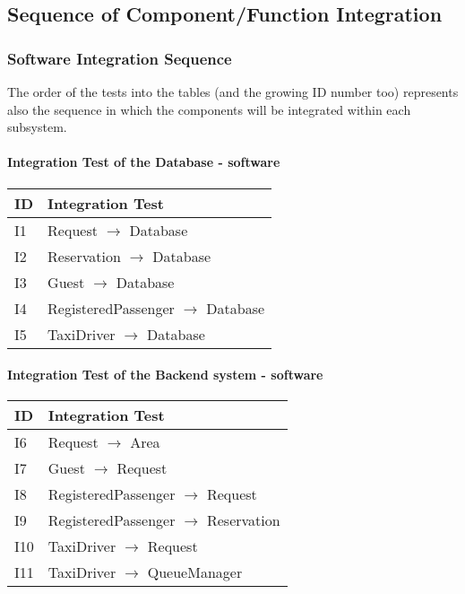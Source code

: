 	\subsection{Sequence of Component/Function Integration}
		\subsubsection{Software Integration Sequence}
		The order of the tests into the tables (and the growing ID number too) represents also the sequence in
		which the components will be integrated within each subsystem.
		\paragraph{Integration Test of the Database - software}
		\begin{tabular}{p{2cm} | p{10cm}} \hline
			\textbf{ID} & \textbf{Integration Test} \\ \hline
			I1 & Request $\rightarrow$ Database \\ \hline
			I2 & Reservation $\rightarrow$ Database \\ \hline
			I3 & Guest $\rightarrow$ Database \\ \hline
			I4 & RegisteredPassenger $\rightarrow$ Database \\ \hline
			I5 & TaxiDriver $\rightarrow$ Database \\ \hline
		\end{tabular}
		\paragraph{Integration Test of the Backend system - software}
		\begin{tabular}{p{2cm} | p{10cm}} \hline
			\textbf{ID} & \textbf{Integration Test} \\ \hline
			I6 & Request $\rightarrow$ Area \\ \hline
			I7 & Guest $\rightarrow$ Request \\ \hline
			I8 & RegisteredPassenger $\rightarrow$ Request \\ \hline
			I9 & RegisteredPassenger $\rightarrow$ Reservation \\ \hline
			I10 & TaxiDriver $\rightarrow$ Request \\ \hline
			I11 & TaxiDriver $\rightarrow$ QueueManager \\ \hline
		\end{tabular}
